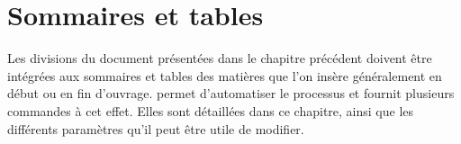 \begin{noprint}
\newcommand{\subpara}[1][]{%
	\refstepcounter{subpara}%
	\subparaskip%
	{\subparanumcolour\subparanumstyle{\thepara\subparanumdash\thesubpara\subparanumsep}%
	 \if\relax#1\relax\label{para:\thepara-\thesubpara}\else\label{para:#1}\fi}%
	\if@paraname
		\if\relax#1\relax\else%
			\if@marginalia%
				\marginpar{\subparacolour\subparastyle{#1}}%
			\else%
				{\subparacolour\subparatitlestyle{#1\subparasep}}%
	\fi\fi\fi	%
	\if\relax#1\relax\else
		\refstepcounter{precis}
		\addtocontents{toc}{%
			\protect\if@subprecis%
				\ifnum\value{precis}>1\cftprecissep\else\cftbeforeprecis\fi%
				{\cftprecisstyle{%
	 				\cftprecisnumstyle\thepara%
	 				\subparanumdash\thesubpara\cftprecisaftersnum}
				#1\cftprecisnumsep\cftprecisleader\thepage\cftprecisafterpnum}%
			\protect\fi%
			\protect\@ifnextchar\protect\contentsline{\protect\cftafterprecis}{}%
			}%
	\fi
	\@ifnextchar\par{\@gobblepar\relax}{\relax}}
\end{noprint}






\chapter{Sommaires et tables}\label{tables-of-contents}




Les divisions du document présentées dans le chapitre précédent doivent être intégrées aux sommaires et tables des matières que l'on insère généralement en début ou en fin d'ouvrage. \frenchlaw permet d'automatiser le processus et fournit plusieurs commandes à cet effet. Elles sont détaillées dans ce chapitre, ainsi que les différents paramètres qu'il peut être utile de modifier.

